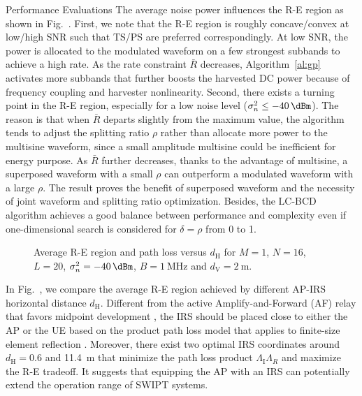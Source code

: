 \documentclass[journal,12pt,onecolumn,draftclsnofoot]{IEEEtran}
\begin{document}
\begin{section}{Performance Evaluations}
		The average noise power influences the R-E region as shown in Fig.~. First, we note that the R-E region is roughly concave/convex at low/high SNR such that TS/PS are preferred correspondingly. At low SNR, the power is allocated to the modulated waveform on a few strongest subbands to achieve a high rate. As the rate constraint $\bar{R}$ decreases, Algorithm~\ref{al:gp} activates more subbands that further boosts the harvested DC power because of frequency coupling and harvester nonlinearity. Second, there exists a turning point in the R-E region, especially for a low noise level ($\sigma_n^2 \le \SI{-40}{\dBm}$). The reason is that when $\bar{R}$ departs slightly from the maximum value, the algorithm tends to adjust the splitting ratio $\rho$ rather than allocate more power to the multisine waveform, since a small amplitude multisine could be inefficient for energy purpose. As $\bar{R}$ further decreases, thanks to the advantage of multisine, a superposed waveform with a small $\rho$ can outperform a modulated waveform with a large $\rho$. The result proves the benefit of superposed waveform and the necessity of joint waveform and splitting ratio optimization. Besides, the LC-BCD algorithm achieves a good balance between performance and complexity even if one-dimensional search is considered for $\delta=\rho$ from \num{0} to \num{1}.

		\begin{figure}[!t]
			\centering
			\caption{Average R-E region and path loss versus $d_{\mathrm{H}}$ for $M=1$, $N=16$, $L=20$, $\sigma_n^2=\SI{-40}{\dBm}$, $B=\SI{1}{\MHz}$ and $d_{\mathrm{V}}=\SI{2}{\meter}$.}
		\end{figure}

		In Fig.~, we compare the average R-E region achieved by different AP-IRS horizontal distance $d_{\mathrm{H}}$. Different from the active Amplify-and-Forward (AF) relay that favors midpoint development \cite{Li2017}, the IRS should be placed close to either the AP or the UE based on the product path loss model that applies to finite-size element reflection \cite{Ozdogan2020,Tang2021}. Moreover, there exist two optimal IRS coordinates around $d_{\mathrm{H}}=0.6$ and \SI{11.4}{\meter} that minimize the path loss product $\Lambda_{\mathrm{I}}\Lambda_R$ and maximize the R-E tradeoff. It suggests that equipping the AP with an IRS can potentially extend the operation range of SWIPT systems.


\end{section}
\end{document}
